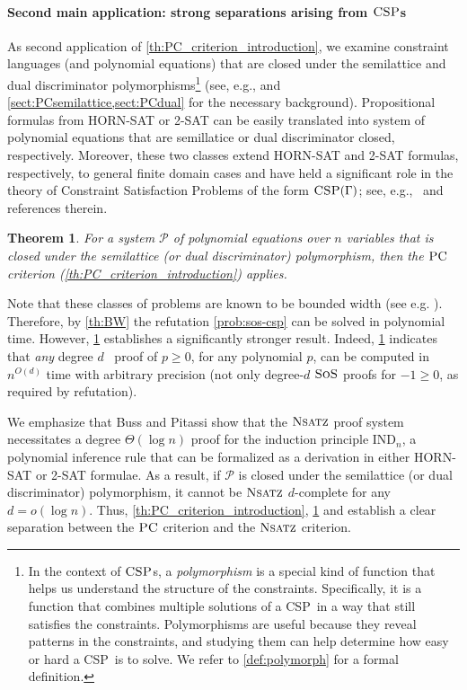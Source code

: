 \documentclass[11pt]{article}
\newcommand{\sos}{\text{\sc{SoS}}}
\newcommand{\CSP}{\textsc{CSP}}
\newcommand{\PC}{\textsc{PC}}
\newcommand{\Nsatz}{\textsc{Nsatz}}
\newcommand{\1}{\textbf{1}}
\newtheorem{theorem}{Theorem}[section]
\begin{document}
\paragraph{Second main application: strong separations arising from $\CSP$s}\label{sec:separation-intro}
As second application of \cref{th:PC_criterion_introduction}, we examine constraint languages (and polynomial equations) that are closed under the semilattice and dual discriminator polymorphisms\footnote{In the context of $\CSP$s, a \emph{polymorphism} is a special kind of function that helps us understand the structure of the constraints. Specifically, it is a function that combines multiple solutions of a \CSP\ in a way that still satisfies the constraints. Polymorphisms are useful because they reveal patterns in the constraints, and studying them can help determine how easy or hard a \CSP\ is to solve. We refer to \cref{def:polymorph} for a formal definition.} (see, e.g., \cite{barto_et_al:DFU:2017:6959} and \cref{sect:PCsemilattice,sect:PCdual} for the necessary background). 
Propositional formulas from \textsc{HORN-SAT} or \textsc{2-SAT} can be easily translated into system of polynomial equations that are semillatice or dual discriminator closed, respectively.
Moreover, these two classes extend \textsc{HORN-SAT} and \textsc{2-SAT} formulas, respectively, to general finite domain cases and have held a significant role in the theory of Constraint Satisfaction Problems of the form $\CSP(\Gamma)$; see, e.g.,~\cite{barto_et_al:DFU:2017:6959,2017dfu7} and references therein.

\begin{theorem}\label{th:semilattice+dualdiscr}
    For a system $\mathcal{P}$ of polynomial equations over $n$ variables that is closed under the semilattice (or dual discriminator) polymorphism, then the $\PC$ criterion (\cref{th:PC_criterion_introduction}) applies.
\end{theorem}
Note that these classes of problems are known to be bounded width (see e.g. \cite{barto_et_al:DFU:2017:6959}). Therefore, by \cref{th:BW} the refutation \cref{prob:sos-csp} can be solved in polynomial time.
However, \cref{th:semilattice+dualdiscr} establishes a significantly stronger result.
Indeed, \cref{th:semilattice+dualdiscr} indicates that \emph{any} degree \( d \) \sos\ proof of $p\geq 0$, for any polynomial $p$, can be computed in \( n^{O(d)} \) time with arbitrary precision (not only degree-$d$ $\sos$ proofs for $-1\geq 0$, as required by refutation). 

We emphasize that Buss and Pitassi \cite{BussP98} 
show that the \(\Nsatz\) proof system necessitates a degree \(\Theta(\log n)\) proof for the induction principle \(\text{IND}_n\), a polynomial inference rule that can be formalized as a derivation in either \textsc{HORN-SAT} or \textsc{2-SAT} formulae. As a result, if \(\mathcal{P}\) is closed under the semilattice (or dual discriminator) polymorphism, it cannot be \(\Nsatz\) \(d\)-complete for any \(d = o(\log n)\).
Thus, \cref{th:PC_criterion_introduction}, \cref{th:semilattice+dualdiscr} and \cite{BussP98} establish a clear separation between the $\PC$ criterion and the \(\Nsatz\) criterion. 
\end{document}
